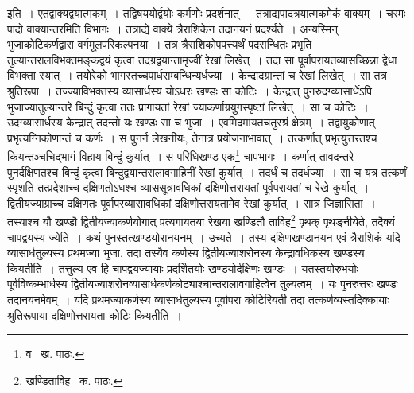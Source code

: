 \documentclass[11pt, openany]{book}
\begin{document}
\noindent इति~। एतद्वाक्यद्वयात्मकम्~। तद्विषययोर्द्वयोः कर्मणोः प्रदर्शनात्~। तत्राद्यपादत्रयात्मकमेकं वाक्यम्~। चरमः पादो वाक्यान्तरमिति विभागः~। तत्राद्ये वाक्ये त्रैराशिकेन तदानयनं प्रदर्श्यते~। अन्यस्मिन् भुजाकोटिकर्णद्वारा वर्गमूलपरिकल्पनया~। तत्र त्रैराशिकोपपत्त्यर्थं पदसन्धितः प्रभृति तुल्यान्तरालविभक्तमङ्कद्वयं कृत्वा तदग्रद्वयान्तामृज्वीं रेखां लिखेत्~। तदा सा पूर्वापरायतव्यासच्छिन्ना द्वेधा विभक्ता स्यात्~। तयोरेको
भागस्तच्चपार्धसम्बन्धिन्यर्धज्या~। केन्द्रादग्रान्तां च रेखां लिखेत्~। सा तत्र श्रुतिरूपा~। तज्ज्याविभक्तस्य व्यासार्धस्य योऽधरः खण्डः सा कोटिः~। केन्द्रात् पुनरुदग्व्यासार्धेऽपि भुजाज्यातुल्यान्तरे बिन्दुं कृत्वा ततः प्रागायतां रेखां ज्याकर्णाग्रयुगस्पृष्टां लिखेत्~। सा च कोटिः~। उदग्व्यासार्धस्य
केन्द्रात् तदन्तो यः खण्डः सा च भुजा~। एवमिदमायतचतुरश्रं क्षेत्रम्~। तद्वायुकोणात् प्रभृत्यग्निकोणान्तं च कर्णः~। स पुनर्न लेखनीयः, तेनात्र
प्रयोजनाभावात्~। तत्कर्णात् प्रभृत्युत्तरतश्च कियन्तञ्चचिद्भागं विहाय बिन्दुं कुर्यात्~। स परिधिखण्ड एक\renewcommand{\thefootnote}{१}\footnote{व \textendash\ ख. पाठः.} चापभागः~। कर्णात् तावदन्तरे पुनर्दक्षिणतश्च बिन्दुं कृत्वा बिन्दुद्वयान्तरालावगाहिनीं रेखां कुर्यात्~। तदर्धं च तदर्धज्या~। सा च यत्र तत्कर्णं स्पृशति तत्प्रदेशाच्च दक्षिणतोऽधश्च व्याससूत्रावधिकां दक्षिणोत्तरायतां पूर्वपरायतां च रेखे कुर्यात्~। द्वितीयज्याग्राच्च दक्षिणतः पूर्वापरव्यासावधिकां दक्षिणोत्तरायतामेव रेखां कुर्यात्~। सात्र जिज्ञासिता~। तस्याश्च यौ खण्डौ द्वितीयज्याकर्णयोगात् प्रत्यगायतया रेखया खण्डितौ ताविह\renewcommand{\thefootnote}{२}\footnote{खण्डिताविह \textendash\ क. पाठः.} पृथक् पृथङ्नीयेते, तदैक्यं चापद्वयस्य ज्येति~। कथं पुनस्तत्खण्डयोरानयनम्~। उच्यते~। तस्य दक्षिणखण्डानयन एवं त्रैराशिकं यदि व्यासार्धतुल्यस्य प्रथमज्या भुजा, तदा तस्यैव कर्णस्य द्वितीयज्याशरोनस्य केन्द्रावधिकस्य खण्डस्य कियतीति~। तत्तुल्य एव हि चापद्वयज्यायाः प्रदर्शितयोः खण्डयोर्दक्षिणः खण्डः~। यतस्तयोरुभयोः पूर्वविष्कम्भार्धस्य द्वितीयज्याशरोनव्यासार्धकर्णकोट्याश्चान्तरालावगाहित्वेन तुल्यत्वम्~। यः पुनरुत्तरः खण्डः तदानयनमेवम्~। यदि प्रथमज्याकर्णस्य व्यासार्धतुल्यस्य पूर्वापरा कोटिरियती तदा तत्कर्णव्यस्तदिक्कायाः श्रुतिरूपाया दक्षिणोत्तरायता कोटिः कियतीति~।

\newpage
\end{document}
